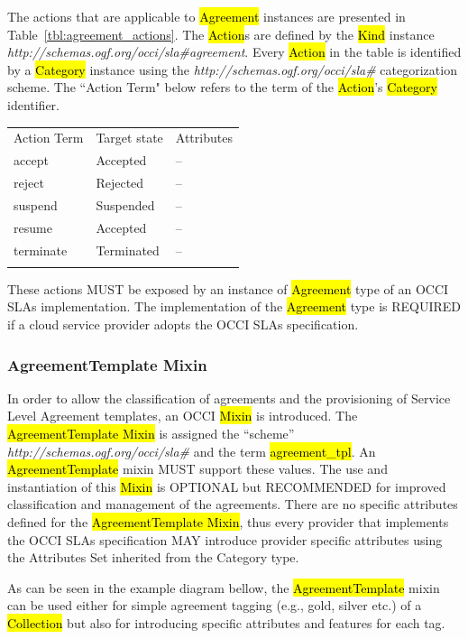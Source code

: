 \documentclass[10pt,a4paper]{article}
\begin{document}
The actions that are applicable to \hl{Agreement} instances are presented in Table~\ref{tbl:agreement_actions}. The \hl{Action}s are defined by the \hl{Kind} instance \textit{http://schemas.ogf.org/occi/sla\#agreement}. Every \hl{Action} in the table is identified by a \hl{Category} instance using the \textit{http://schemas.ogf.org/occi/sla\#} categorization scheme. The “Action Term" below refers to the term of the \hl{Action}'s \hl{Category} identifier.


{
	\begin{tabular}{lll}
	\toprule
	Action Term & Target state & Attributes \\
	\colrule
	accept & Accepted & -- \\
	reject & Rejected & -- \\
	suspend & Suspended & -- \\
	resume & Accepted & -- \\
	terminate & Terminated & -- \\
	\botrule
	\end{tabular}
}


These actions MUST be exposed by an instance of \hl{Agreement} type of an OCCI SLAs implementation. The implementation of the \hl{Agreement} type is REQUIRED if a cloud service provider adopts the OCCI SLAs specification.


\subsubsection{AgreementTemplate Mixin}
In order to allow the classification of agreements and the provisioning of Service Level Agreement templates, an OCCI \hl{Mixin} is introduced. The \hl{AgreementTemplate Mixin} is assigned the “scheme” \textit{http://schemas.ogf.org/occi/sla\#} and the term \hl{agreement\_tpl}. An \hl{AgreementTemplate} mixin MUST support these values. The use and instantiation of this \hl{Mixin} is OPTIONAL but RECOMMENDED for improved classification and management of the agreements.  There are no specific attributes defined for the \hl{AgreementTemplate Mixin}, thus every provider that implements the OCCI SLAs specification MAY introduce provider specific attributes using the Attributes Set inherited from the Category type.

As can be seen in the example diagram bellow, the \hl{AgreementTemplate} mixin can be used either for simple agreement tagging (e.g., gold, silver etc.) of a \hl{Collection} but also for introducing specific attributes and features for each tag.
\end{document}
